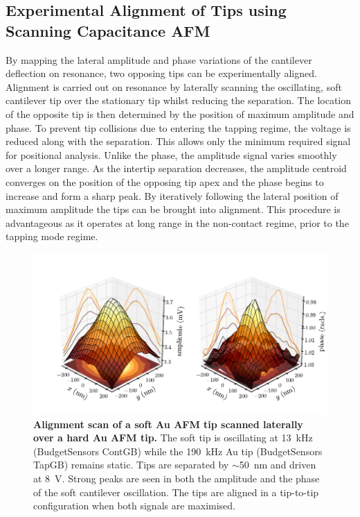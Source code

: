 \documentclass{article}
\begin{document}
\FloatBarrier
\subsection{Experimental Alignment of Tips using Scanning Capacitance AFM}

By mapping the lateral amplitude and phase variations of the cantilever deflection on resonance, two opposing tips can be experimentally aligned. Alignment is carried out on resonance by laterally scanning the oscillating, soft cantilever tip over the stationary tip whilst reducing the separation. The location of the opposite tip is then determined by the position of maximum amplitude and phase. To prevent tip collisions due to entering the tapping regime, the voltage is reduced along with the separation. This allows only the minimum required signal for positional analysis. Unlike the phase, the amplitude signal varies smoothly over a longer range. As the intertip separation decreases, the amplitude centroid converges on the position of the opposing tip apex and the phase begins to increase and form a sharp peak.  By iteratively following the lateral position of maximum amplitude the tips can be brought into alignment. This procedure is advantageous as it operates at long range in the non-contact regime, prior to the tapping mode regime.

\begin{figure}[bt]
\centering
\includegraphics[clip=true, trim=33 19 0 33]{figures/alignment_scan}
\caption[Alignment scan of a soft Au AFM tip scanned laterally over a hard Au AFM tip]{\textbf{Alignment scan of a soft Au AFM tip scanned laterally over a hard Au AFM tip.} The soft tip is oscillating at \SI{13}{kHz} (BudgetSensors ContGB) while the \SI{190}{kHz} Au tip (BudgetSensors TapGB) remains static. Tips are separated by $\sim$\SI{50}{nm} and driven at \SI{8}{V}. Strong peaks are seen in both the amplitude and the phase of the soft cantilever oscillation. The tips are aligned in a tip-to-tip configuration when both signals are maximised.}
\label{fig:alignment_scan} 
\end{figure}
\end{document}
